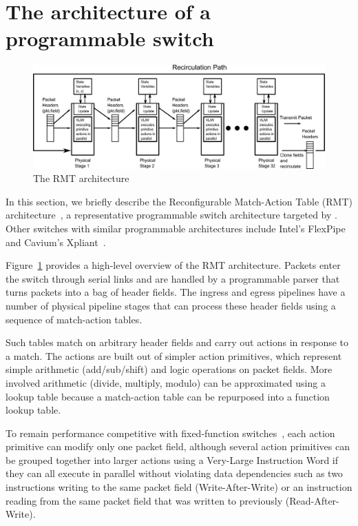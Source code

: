 \section{The architecture of a programmable switch}
\label{s:context}

\begin{figure}[t]
\includegraphics[width=\textwidth]{p4_switch_model.pdf}
\caption{The RMT architecture}
\label{fig:architecture}
\end{figure}

\label{s:architecture}
In this section, we briefly describe the Reconfigurable Match-Action Table
(RMT) architecture~\cite{rmt}, a representative programmable switch
architecture targeted by \pktlanguage{}. Other switches with similar
programmable architectures include Intel's FlexPipe~\cite{flexpipe} and
Cavium's Xpliant~\cite{xpliant}.

Figure~\ref{fig:architecture} provides a high-level overview of the RMT
architecture. Packets enter the switch through serial links and are handled by
a programmable parser that turns packets into a bag of header fields. The
ingress and egress pipelines have a number of physical pipeline stages that can
process these header fields using a sequence of match-action tables.

Such tables match on arbitrary header fields and carry out actions in response
to a match.  The actions are built out of simpler action primitives, which
represent simple arithmetic (add/sub/shift) and logic operations on packet
fields.  More involved arithmetic (divide, multiply, modulo) can be
approximated using a lookup table because a match-action table can be
repurposed into a function lookup table.

To remain performance competitive with fixed-function switches~\cite{mellanox,
trident, tomahawk}, each action primitive can modify only one packet field,
although several action primitives can be grouped together into larger actions
using a Very-Large Instruction Word if they can all execute in parallel without
violating data dependencies such as two instructions writing to the same packet
field (Write-After-Write) or an instruction reading from the same packet field
that was written to previously (Read-After-Write).

